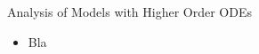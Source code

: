 %
%



\begin{module}{Analysis of Models with Higher Order ODEs}
	\label{2nd:analysis}

	
	
\end{module}



\begin{lesson}

	\begin{itemize}
		\item Bla
	\end{itemize}
	

\end{lesson}




\newpage

\question

